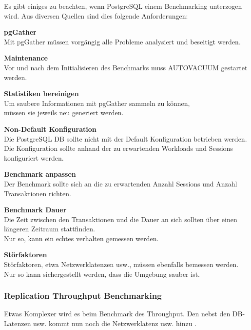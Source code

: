 \begin{flushleft}
    Es gibt einiges zu beachten, wenn PostgreSQL einem Benchmarking unterzogen wird.
    Aus diversen Quellen \cite{768DXXJK, 67TNVGTX, T3VEV98H, VXNYQFTE} sind dies folgende Anforderungen:
     \begin{description}
        \item \textbf{pgGather}\hfill \\Mit pgGather \cite{FGL8E2X5} müssen vorgängig alle Probleme analysiert und beseitigt werden.
        \item \textbf{Maintenance}\hfill \\Vor und nach dem Initialisieren des Benchmarks muss \Gls{AUTOVACUUM} gestartet werden.
        \item \textbf{Statistiken bereinigen}\hfill \\Um saubere Informationen mit pgGather sammeln zu können,\\müssen sie jeweils neu generiert werden.
        \item \textbf{Non-Default Konfiguration}\hfill \\Die PostgreSQL DB sollte nicht mit der Default Konfiguration betrieben werden.\\Die Konfiguration sollte anhand der zu erwartenden Workloads und Sessions konfiguriert werden.
        \item \textbf{Benchmark anpassen}\hfill \\Der Benchmark sollte sich an die zu erwartenden Anzahl Sessions und Anzahl \Gls{Transaktion}en richten.
        \item \textbf{Benchmark Dauer}\hfill \\Die Zeit zwischen den \Gls{Transaktion}en und die Dauer an sich sollten über einen längeren Zeitraum stattfinden.\\Nur so, kann ein echtes verhalten gemessen werden.
        \item \textbf{Störfaktoren}\hfill \\Störfaktoren, etwa Netzwerklatenzen \cite{5VBTYNB7} usw.,
        müssen ebenfalls bemessen werden.\\Nur so kann sichergestellt werden, dass die Umgebung sauber ist.
    \end{description}
\end{flushleft}
\begin{flushleft}
    \subsubsection{Replication Throughput Benchmarking}
    Etwas Komplexer wird es beim Benchmark des Throughput.
    Den nebst den DB-Latenzen usw. kommt nun noch die Netzwerklatenz usw. hinzu \cite{UU5X5NID}.

\end{flushleft}
